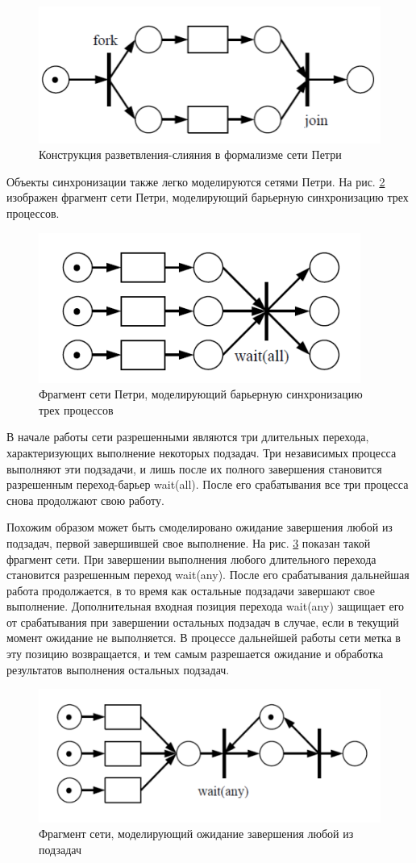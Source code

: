 \begin{figure}[ht]
\centerline{\includegraphics[width=0.5\linewidth]{images/image6.png}}
\caption{Конструкция разветвления-слияния в формализме сети Петри}
\label{fig6}
\end{figure}

Объекты синхронизации также легко моделируются сетями Петри. На рис. \ref{fig7} изображен фрагмент сети Петри, моделирующий барьерную синхронизацию трех процессов.

\begin{figure}[ht]
\centerline{\includegraphics[width=0.5\linewidth]{images/image7.png}}
\caption{Фрагмент сети Петри, моделирующий барьерную синхронизацию
трех процессов}
\label{fig7}
\end{figure}

В начале работы сети разрешенными являются три длительных перехода, характеризующих выполнение некоторых подзадач. Три независимых процесса выполняют эти подзадачи, и лишь после их полного завершения становится разрешенным переход-барьер wait(all). После его срабатывания все три процесса снова продолжают свою работу.

Похожим образом может быть смоделировано ожидание завершения любой из подзадач, первой завершившей свое выполнение. На рис. \ref{fig8} показан такой фрагмент сети. При завершении выполнения любого длительного перехода становится разрешенным переход wait(any). После его срабатывания дальнейшая работа продолжается, в то время как остальные подзадачи завершают свое выполнение. Дополнительная входная позиция перехода wait(any) защищает его от срабатывания при завершении остальных подзадач в случае, если в текущий момент ожидание не выполняется. В процессе дальнейшей работы сети метка в эту позицию возвращается, и тем самым разрешается ожидание и обработка результатов выполнения остальных подзадач.

\begin{figure}[ht]
\centerline{\includegraphics[width=0.5\linewidth]{images/image8.png}}
\caption{Фрагмент сети, моделирующий ожидание завершения любой из подзадач}
\label{fig8}
\end{figure}

